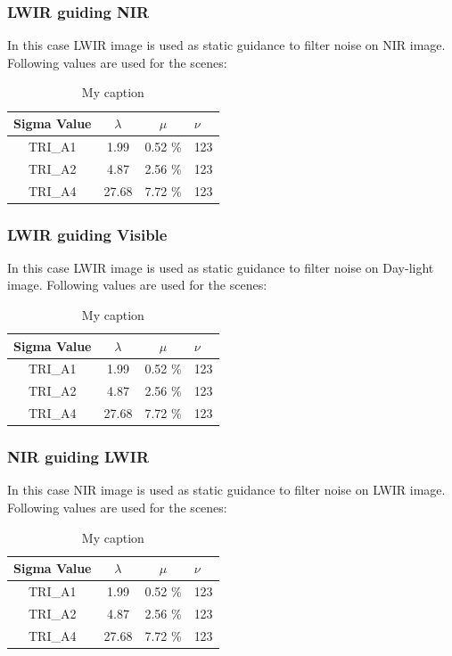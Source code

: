 \documentclass[10pt,twocolumn,letterpaper]{article}
\begin{document}
\subsubsection{LWIR guiding NIR}
In this case LWIR image is used as static guidance to filter noise on NIR image. Following values are used for the scenes:
\begin{table}[ht]
	\centering
	\caption{My caption}
	\label{my-label}
	\begin{tabular}{@{}cccl@{}}
		\toprule
		\bfseries Sigma Value & \(\lambda\) & \(\mu\) & \(\nu\) \\ \midrule
		TRI\_A1               & 1.99        & 0.52 \% & 123       \\
		TRI\_A2               & 4.87        & 2.56 \% & 123        \\
		TRI\_A4               & 27.68       & 7.72 \% & 123        \\ \bottomrule
	\end{tabular}
\end{table}
\subsubsection{LWIR guiding Visible}
In this case LWIR image is used as static guidance to filter noise on Day-light image. Following values are used for the scenes:
\begin{table}[ht]
	\centering
	\caption{My caption}
	\label{my-label}
	\begin{tabular}{@{}cccl@{}}
		\toprule
		\bfseries Sigma Value & \(\lambda\) & \(\mu\) & \(\nu\) \\ \midrule
		TRI\_A1               & 1.99        & 0.52 \% & 123       \\
		TRI\_A2               & 4.87        & 2.56 \% & 123        \\
		TRI\_A4               & 27.68       & 7.72 \% & 123        \\ \bottomrule
	\end{tabular}
\end{table}
\subsubsection{NIR guiding LWIR}
In this case NIR image is used as static guidance to filter noise on LWIR image. Following values are used for the scenes:
\begin{table}[ht]
	\centering
	\caption{My caption}
	\label{my-label}
	\begin{tabular}{@{}cccl@{}}
		\toprule
		\bfseries Sigma Value & \(\lambda\) & \(\mu\) & \(\nu\) \\ \midrule
		TRI\_A1               & 1.99        & 0.52 \% & 123       \\
		TRI\_A2               & 4.87        & 2.56 \% & 123        \\
		TRI\_A4               & 27.68       & 7.72 \% & 123        \\ \bottomrule
	\end{tabular}
\end{table}
\end{document}
